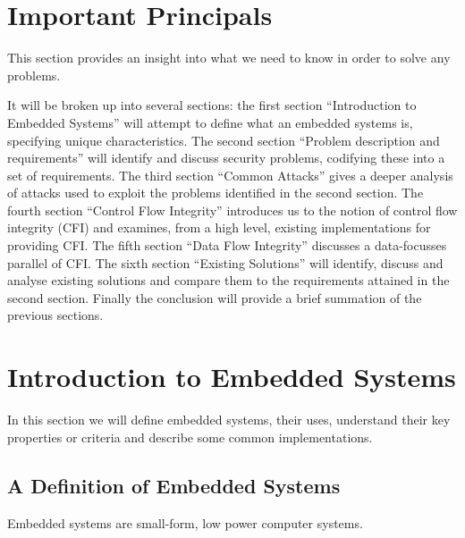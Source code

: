 \section{Important Principals}\label{principalsInto}

This section provides an insight into what we need to know in order to solve any problems.

It will be broken up into several sections: the first section ``Introduction to Embedded Systems'' will attempt to define what an embedded systems is, specifying unique characteristics. The second section ``Problem description and requirements'' will identify and discuss security problems, codifying these into a set of requirements. The third section ``Common Attacks'' gives a deeper analysis of attacks used to exploit the problems identified in the second section. The fourth section ``Control Flow Integrity'' introduces us to the notion of control flow integrity (CFI) and examines, from a high level, existing implementations for providing CFI. The fifth section ``Data Flow Integrity'' discusses a data-focusses parallel of CFI. The sixth section ``Existing Solutions'' will identify, discuss and analyse existing solutions and compare them to the requirements attained in the second section. Finally the conclusion will provide a brief summation of the previous sections.

\section{Introduction to Embedded Systems}\label{introEmbeddedSystems}

In this section we will define embedded systems, their uses, understand their key properties or criteria and describe some common implementations.


\subsection{A Definition of Embedded Systems}\label{defineEmbeddedSystems}

Embedded systems are small-form, low power computer systems.

